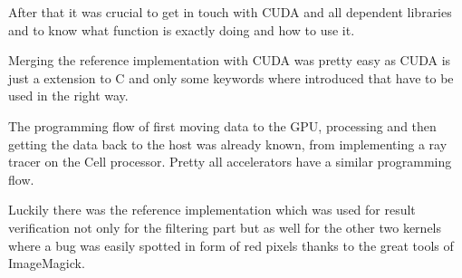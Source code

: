 After that it was crucial to get in touch with \gls{CUDA} and all dependent
libraries and to know what function is exactly doing and how to use it. 

Merging the reference implementation with \gls{CUDA} was pretty easy as \gls{CUDA}
is just a extension to C and only some keywords where introduced that have to 
be used in the right way. 

The programming flow of first moving data to the \gls{GPU}, processing and then
getting the data back to the host was already known, from implementing a ray tracer
on the Cell processor. Pretty all accelerators have a similar programming flow. 

Luckily there was the reference implementation which was used for result verification
not only for the filtering part but as well for the other two kernels where a bug
was easily spotted in form of red pixels thanks to the great tools of ImageMagick.

















